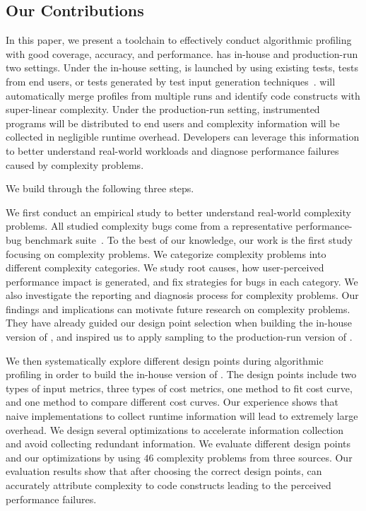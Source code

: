 \subsection{Our Contributions}
\label{sec:con}

In this paper, 
we present a toolchain \Tool to effectively conduct algorithmic profiling with 
good coverage, accuracy, and performance. 
\Tool has in-house and production-run two settings. 
Under the in-house setting, 
\Tool is launched by using existing tests, tests from end users, 
or tests generated by test input generation techniques~\cite{KLEE,s2e,dart,EventBreak}. 
\Tool will automatically merge profiles from multiple runs and 
identify code constructs with super-linear complexity. 
Under the production-run setting, 
instrumented programs will be distributed to end users 
and complexity information will be collected in negligible runtime overhead. 
Developers can leverage this information to better understand real-world workloads
and diagnose performance failures caused by complexity problems. 


We build \Tool through the following three steps.

We first conduct an empirical study to better understand 
real-world complexity problems.
All studied complexity bugs come from a representative 
performance-bug benchmark suite~\cite{PerfBug,SongOOPSLA2014}.
To the best of our knowledge, our work is the first study focusing on complexity problems.
We categorize complexity problems into different complexity categories.
We study root causes, 
how user-perceived performance impact is generated, 
and fix strategies for bugs in each category. 
We also investigate the reporting and diagnosis process for complexity problems.
Our findings and implications can motivate future research on complexity problems. 
They have already guided our design point selection when building the in-house version of \Tool, 
and inspired us to apply sampling to the production-run version of \Tool. 

We then systematically explore different design points during algorithmic profiling 
in order to build the in-house version of \Tool. 
The design points include two types of input metrics, 
three types of cost metrics, 
one method to fit cost curve, 
and one method to compare different cost curves. 
Our experience shows that naive implementations 
to collect runtime information
will lead to extremely large overhead. 
We design several optimizations to accelerate information collection 
and avoid collecting redundant information.  
We evaluate different design points and our optimizations 
by using $46$ complexity problems from three sources. 
Our evaluation results show that after choosing the correct design points, 
\Tool can accurately attribute complexity to code constructs 
leading to the perceived performance failures. 

